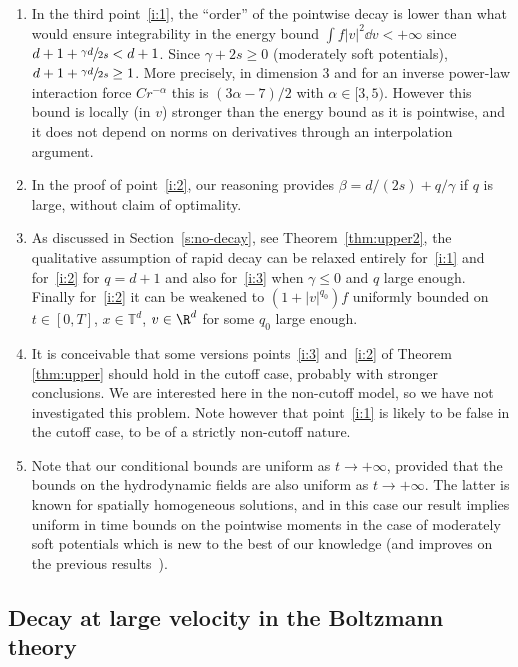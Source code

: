 \skpt
\begin{remarks}
\begin{enumerate}
\item In the third point~\eqref{i:1}, the ``order'' of the pointwise
decay is lower than what would ensure integrability in the energy
bound $\int f |v|^2 \dd v <+\infty$ since
$d+1+ \sfrac{\gamma d}{2s}<d+1$. Since $\gamma+2s \ge 0$
(moderately soft potentials), $d+1+\sfrac{\gamma d}{2s} \ge
1$. More precisely, in dimension $3$ and for an inverse power-law
interaction force $Cr^{-\alpha}$ this is $(3\alpha-7)/2$ with
$\alpha \in [3,5)$. However this bound is locally (in $v$)
stronger than the energy bound as it is pointwise, and it does not
depend on norms on derivatives through an interpolation argument.

\item In the proof of point~\eqref{i:2}, our reasoning provides
$\beta = d/(2s) + q/\gamma$ if $q$ is large, without claim of
optimality.
\item As discussed in Section~\ref{s:no-decay}, see
Theorem~\ref{thm:upper2}, the qualitative assumption of rapid decay
can be relaxed entirely for~\eqref{i:1} and for~\eqref{i:2} for
$q=d+1$ and also for~\eqref{i:3} when $\gamma \le 0$ and $q$ large
enough. Finally for~\eqref{i:2} it can be weakened to $(1+|v|^{q_0})f$
uniformly bounded on $t \in [0,T]$, $x \in \mathbb{T}^d$, $v \in
\R^d$ for some $q_0$ large enough.
\item It is conceivable that some versions points~\eqref{i:3}
and~\eqref{i:2} of Theorem \ref{thm:upper} should hold in the
cutoff case, probably with stronger conclusions. We are interested
here in the non-cutoff model, so we have not investigated this
problem. Note however that point~\eqref{i:1} is likely to be false
in the cutoff case, \ie to be of a strictly non-cutoff nature.
\item
Note that our conditional bounds are uniform as $t \to +\infty$, provided that the bounds on the hydrodynamic fields are also uniform as $t \to +\infty$. The latter is known for spatially homogeneous solutions, and in this case our result implies uniform in time bounds on the pointwise moments in the case of moderately soft potentials which is new to the best of our knowledge (and improves on the previous results~\cite{MR1233644,MR2359877}).
\end{enumerate}
\end{remarks}

\subsection{Decay at large velocity in the Boltzmann theory}

